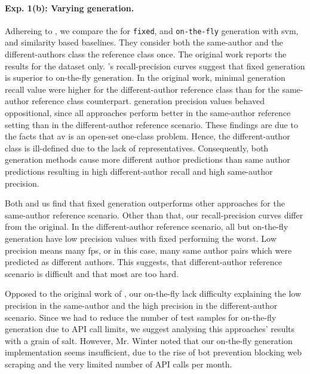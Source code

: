 \paragraph{Exp. 1(b): Varying \imp{} generation.}

Adhereing to \citet{koppel_determining_2014}, we compare the \impAppr{} for \texttt{fixed}, and \texttt{on-the-fly} \imp{} generation with \ac{svm}, and similarity based baselines.
They consider both the same-author and the different-authors class the reference class once.
The original work reports the results for the \dataBlog{} dataset only.
\citet{koppel_determining_2014}'s recall-precision curves suggest that fixed \imp{} generation is superior to on-the-fly \imp{} generation.
In the original work, minimal \imp{} generation recall value were higher for the different-author reference class than for the same-author reference class counterpart.
\Imp{} generation precision values behaved oppositional, since all approaches perform better in the same-author reference setting than in the different-author reference scenario.
These findings are due to the facts that \ac{av} is an open-set one-class problem.
Hence, the different-author class is ill-defined due to the lack of representatives.
Consequently, both \imp{} generation methods cause more different author predictions than same author predictions resulting in high different-author recall and high same-author precision.

Both \citet{koppel_determining_2014} and us find that fixed \imp{} generation outperforms other approaches for the same-author reference scenario.
Other than that, our recall-precision curves differ from the original.
In the different-author reference scenario, all but on-the-fly generation have low precision values with fixed \imps{} performing the worst. 
Low precision means many \acp{fp}, or in this case, many same author pairs which were predicted as different authors.
This suggests, that different-author reference scenario is difficult and that most \imps{} are too hard. 

Opposed to the original work of \citet{koppel_determining_2014}, our on-the-fly \imps{} lack difficulty explaining the low precision in the same-author and the high precision in the different-author scenario.
Since we had to reduce the number of test samples for on-the-fly \imp{} generation due to API call limits, we suggest analysing this approaches' results with a grain of salt.
However, Mr. Winter noted that our on-the-fly \imp{} generation implementation seems insufficient, due to the rise of bot prevention blocking web scraping and the very limited number of API calls per month.

